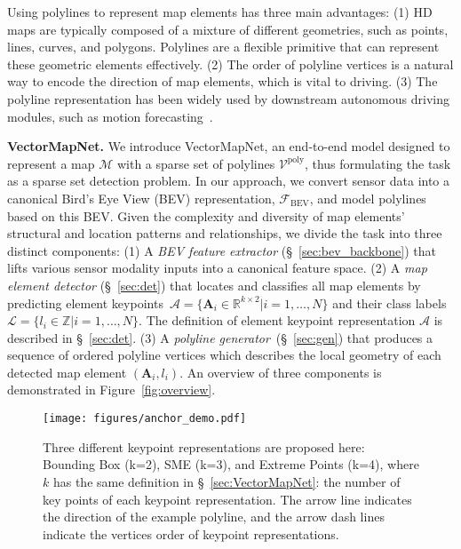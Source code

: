 \documentclass{article}
\theoremstyle{plain}
\theoremstyle{definition}
\theoremstyle{remark}
\begin{document}
Using polylines to represent map elements has three main advantages: 
(1) HD maps are typically composed of a mixture of different geometries, such as points, lines, curves, and polygons. Polylines are a flexible primitive that can represent these geometric elements effectively. 
(2) The order of polyline vertices is a natural way to encode the direction of map elements, which is vital to driving. 
(3) The polyline representation has been widely used by downstream autonomous driving modules, such as motion forecasting~\citep{vectornet}.


\noindent\textbf{VectorMapNet.} We introduce VectorMapNet, an end-to-end model designed to represent a map $\mathcal{M}$ with a sparse set of polylines $\bm{\mathcal{V}}^{\mathrm{poly}}$, thus formulating the task as a sparse set detection problem. In our approach, we convert sensor data into a canonical Bird's Eye View (BEV) representation, $\bm{\mathcal{F}}_{\mathrm{BEV}}$, and model polylines based on this BEV. Given the complexity and diversity of map elements' structural and location patterns and relationships, we divide the task into three distinct components: (1) A \textit{BEV feature extractor} (\S~\ref{sec:bev_backbone}) that lifts various sensor modality inputs into a canonical feature space.
(2) A \textit{map element detector} (\S~\ref{sec:det}) that locates and classifies all map elements by predicting element keypoints~$\bm{\mathcal{A}}=\{\bm{A}_i\in\mathbb{R}^{k\times 2}|i=1,\dots,N\}$ and their class labels~$\bm{\mathcal{L}}=\{l_i\in\mathbb{Z}|i=1,\dots,N\}$. 
The definition of element keypoint representation $\mathcal{A}$ is described in \S~\ref{sec:det}.
(3) A \textit{polyline generator}~(\S~\ref{sec:gen}) that produces a sequence of ordered polyline vertices which describes the local geometry of each detected map element $(\bm{A}_i, l_i)$.
An overview of three components is demonstrated in Figure~\ref{fig:overview}.


\begin{figure*}[t]
    \centering
    \texttt{[image: figures/anchor\_demo.pdf]}
    \vspace{-1em}
    \caption{Three different keypoint representations are proposed here: Bounding Box (k=2), SME (k=3), and Extreme Points (k=4), where $k$ has the same definition in \S~\ref{sec:VectorMapNet}: the number of key points of each keypoint representation. The arrow line indicates the direction of the example polyline, and the arrow dash lines indicate the vertices order of keypoint representations.
    }
    \label{fig:anchor}
    \vspace{-1em}
\end{figure*}
\end{document}

